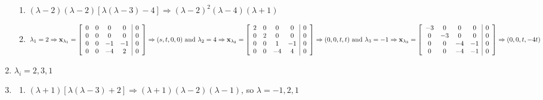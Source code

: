 \documentclass[12pt]{article}
\begin{document}
\begin{enumerate}
    \begin{enumerate}

      \item $(\lambda-2)(\lambda-2)\left[ \lambda(\lambda-3)-4 \right]\Rightarrow (\lambda-2)^2(\lambda-4)(\lambda+1)$

      \item $\lambda_1=2\Rightarrow \bold{x}_{\lambda_1}=\left[ \begin{array}{cccc|c} 0 & 0 & 0 & 0 & 0\\ 0 & 0 & 0 & 0 & 0\\ 0 & 0 & -1 & -1 & 0\\ 0 & 0 & -4 & 2 & 0   \end{array} \right]\Rightarrow (s,t,0,0)\text{ and }\lambda_2=4\Rightarrow \bold{x}_{\lambda_2}=\left[ \begin{array}{cccc|c} 2 & 0 & 0 & 0 & 0\\ 0 & 2 & 0 & 0 & 0\\ 0 & 0 & 1 & -1 & 0\\ 0 & 0 & -4 & 4 & 0 \end{array} \right]\Rightarrow (0,0,t,t)\text{ and }\lambda_3=-1\Rightarrow \bold{x}_{\lambda_3}=\left[ \begin{array}{cccc|c} -3 & 0 & 0 & 0 & 0\\ 0 & -3 & 0 & 0 & 0\\ 0 & 0 & -4 & -1 & 0\\ 0 & 0 & -4 & -1& 0   \end{array} \right]\Rightarrow (0,0,t,-4t)$

    \end{enumerate}

    \setcounter{enumi}{40}

  \item $\lambda_i=2,3,1$

    \setcounter{enumi}{46}

  \item 

    \begin{enumerate}

      \item $(\lambda+1)\left[ \lambda(\lambda-3)+2 \right]\Rightarrow (\lambda+1)(\lambda-2)(\lambda-1)$, so $\lambda=-1,2,1$


\end{enumerate}
\end{enumerate}
\end{document}
